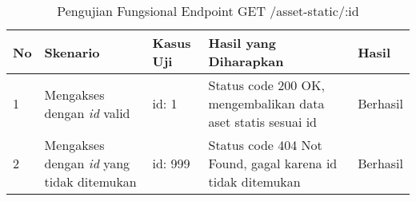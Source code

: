 \begin{table}[H]
    \centering
    \begin{tabular}{|p{0.5cm}|p{3cm}|p{5cm}|p{5cm}|p{1.5cm}|}
        \hline
        \rowcolor[HTML]{DAE8FC} 
        \textbf{No} & \textbf{Skenario} & \textbf{Kasus Uji} & \textbf{Hasil yang Diharapkan} & \textbf{Hasil} \\ \hline
        1 & Mengakses dengan \textit{id} valid & 
        id: 1 & 
        Status code 200 OK, mengembalikan data aset statis sesuai id & 
        Berhasil \\ \hline
        2 & Mengakses dengan \textit{id} yang tidak ditemukan & 
        id: 999 & 
        Status code 404 Not Found, gagal karena id tidak ditemukan & 
        Berhasil \\ \hline
    \end{tabular}
    \caption{Pengujian Fungsional Endpoint GET /asset-static/:id}
    \label{tab:asset_static_getone_testing}
\end{table}
